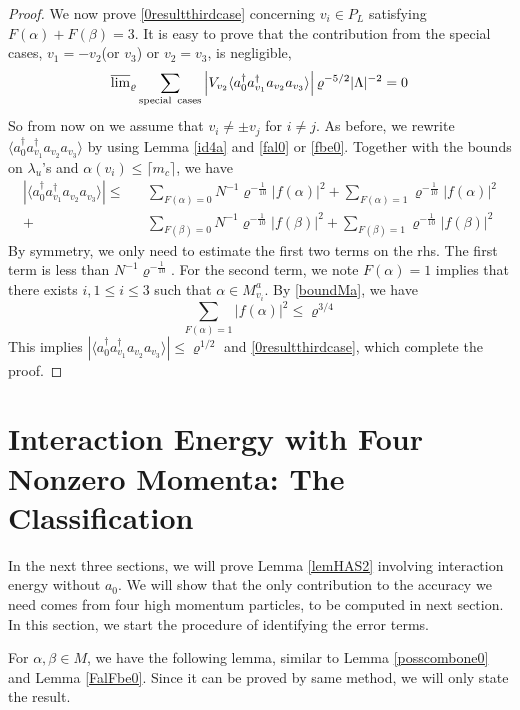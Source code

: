 \documentclass[11pt]{article}
\numberwithin{equation}{section}
\newcommand{\beq}{\begin{equation}}
\newcommand{\eeq}{\end{equation}}
\newcommand{\beqa}{\begin{eqnarray}}
\newcommand{\eeqa}{\end{eqnarray}}
\newcommand\al{{\alpha}}
\newcommand\be{\beta}
\renewcommand\rho\varrho
\theoremstyle{definition}
\begin{document}
\begin{proof}
We now prove \eqref{0resultthirdcase} concerning   $v_i\in P_L$ satisfying   $F(\al)+F(\be)=3$.   
It is easy to prove that the contribution from the special cases,  $v_1=-v_2$(or $v_3$) or $v_2=v_3$,  is negligible, 
\beq
\overline\lim_{\rho}\sum_{\rm special\,\,\,cases}
  \left |  V_{v_2} \langle a^\dagger_0a^\dagger_{v_1}a_{v_2}a_{v_3}\rangle \right | 
\rho^{-5/2}|\Lambda|^{-2}=0
\eeq
So from now on we assume that $v_i\neq \pm v_j$ for $i\neq j$.  As before, we rewrite  $\langle a^\dagger_0a^\dagger_{v_1}a_{v_2}a_{v_3}\rangle$ by using  Lemma \ref{id4a} and \eqref{fal0} or \eqref{fbe0}.  Together with the bounds on $\lambda_u$'s  and $\al(v_i)\leq \lceil m_c\rceil$, we have
\beqa
|\langle a^\dagger_0a^\dagger_{v_1}a_{v_2}a_{v_3}\rangle|
\leq &&\sum_{F(\al)=0}N^{-1}\rho^{-\frac{1}{10}} |f(\al)|^2+\sum_{F(\al)=1}\rho^{-\frac{1}{10}} |f(\al)|^2\\\nonumber
+&&\sum_{F(\be)=0}N^{-1}\rho^{-\frac{1}{10}} |f(\be)|^2+\sum_{F(\be)=1}\rho^{-\frac{1}{10}} |f(\be)|^2
\eeqa
By symmetry, we only need to estimate the first two terms on the rhs. The first term is less than $N^{-1}\rho^{-\frac{1}{10}}$. For the second term,  we note $F(\al)=1$ implies  that there exists $i, 1\leq i\leq 3$
such that  $\al \in M_{v_i}^a$.  By \eqref{boundMa}, we have
\beq
\sum_{F(\al)=1}|f(\al)|^2\leq \rho^{3/4}
\eeq
This implies $|\langle a^\dagger_0a^\dagger_{v_1}a_{v_2}a_{v_3}\rangle|\le \rho^{1/2}$ and \eqref{0resultthirdcase}, which 
complete the proof.
\end{proof}
 
 




 
\section{Interaction Energy with Four Nonzero Momenta: The Classification} 

In the next three sections, we will prove Lemma \ref{lemHAS2} involving interaction energy without $a_0$. 
We will show that the only contribution to the accuracy we need comes from four high momentum particles, 
to  be computed in next section. In this section, we start the procedure of identifying the error terms. 

For $\al, \be \in M$, we have the following lemma, similar to  Lemma \ref{posscombone0} and Lemma \ref{FalFbe0}. 
Since it can be proved by same method, we will only state the result. 
\end{document}
